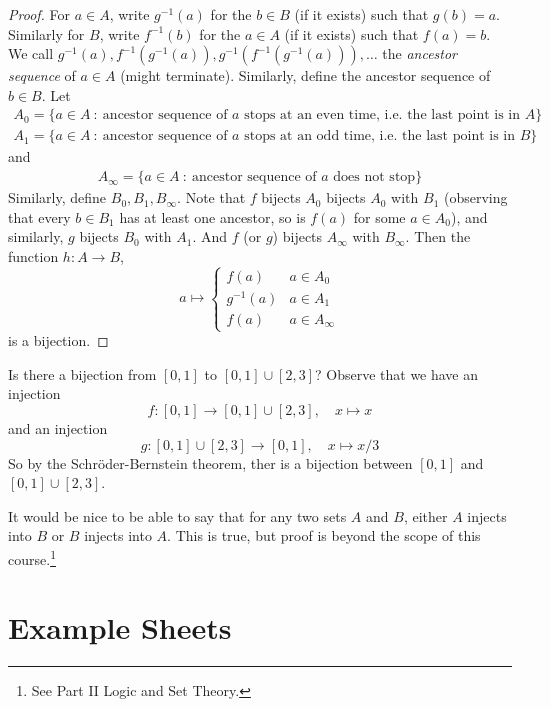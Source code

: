 \documentclass[10pt, a4paper, twoside]{report}
\begin{document}
\begin{proof}
    For \(a\in A\), write \(g^{-1}(a)\) for the \(b\in B\) (if it exists) such that \(g(b)=a\). Similarly for \(B\), write \(f^{-1}(b)\) for the \(a\in A\) (if it exists) such that \(f(a)=b\). We call \(g^{-1}(a),f^{-1}(g^{-1}(a)),g^{-1}(f^{-1}(g^{-1}(a))),\ldots\) the \emph{ancestor sequence} of \(a\in A\) (might terminate). Similarly, define the ancestor sequence of \(b\in B\). Let 
    \begin{align*}
        A_0=\{a\in A\::\:\text{ancestor sequence of \(a\) stops at an even time, i.e. the last point is in \(A\)}\}        
    \end{align*}
    \begin{align*}
        A_1=\{a\in A\::\:\text{ancestor sequence of \(a\) stops at an odd time, i.e. the last point is in \(B\)}\}        
    \end{align*}
    and
    \begin{align*}
        A_\infty=\{a\in A\::\:\text{ancestor sequence of \(a\) does not stop}\}        
    \end{align*}
    Similarly, define \(B_0,B_1,B_\infty\). Note that \(f\) bijects \(A_0\) bijects \(A_0\) with \(B_1\) (observing that every \(b\in B_1\) has at least one ancestor, so is \(f(a)\) for some \(a\in A_0\)), and similarly, \(g\) bijects \(B_0\) with \(A_1\). And \(f\) (or \(g\)) bijects \(A_\infty\) with \(B_\infty\). Then the function \(h:A\to B\),
    \[a\mapsto\begin{cases}
        f(a) & a\in A_0 \\
        g^{-1}(a) & a\in A_1 \\
        f(a) & a\in A_\infty
    \end{cases}\]
is a bijection.
\end{proof}
\begin{example}
    Is there a bijection from \([0,1]\) to \([0,1]\cup[2,3]\)? Observe that we have an injection 
    \[f:[0,1]\to[0,1]\cup[2,3],\quad x\mapsto x\]
    and an injection \[g:[0,1]\cup[2,3]\to[0,1],\quad x\mapsto x/3\]
    So by the Schröder-Bernstein theorem, ther is a bijection between \([0,1]\) and \([0,1]\cup[2,3]\).
\end{example}
It would be nice to be able to say that for any two sets \(A\) and \(B\), either \(A\) injects into \(B\) or \(B\) injects into \(A\). This is true, but proof is beyond the scope of this course.\footnote{See Part II Logic and Set Theory.}
\newpage
\section{Example Sheets}
\end{document}
